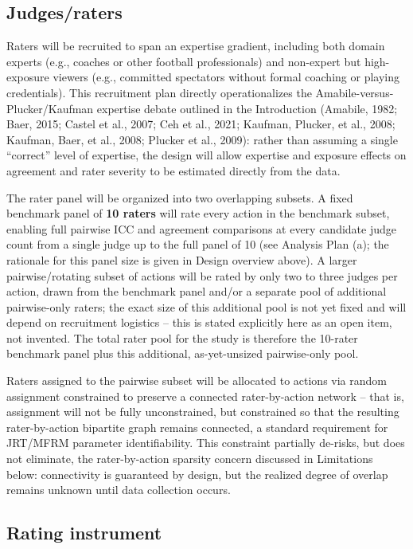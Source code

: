 \documentclass[
  12pt,
]{article}
\begin{document}
\subsection{Judges/raters}\label{judgesraters}

Raters will be recruited to span an expertise gradient, including both
domain experts (e.g., coaches or other football professionals) and
non-expert but high-exposure viewers (e.g., committed spectators without
formal coaching or playing credentials). This recruitment plan directly
operationalizes the Amabile-versus-Plucker/Kaufman expertise debate
outlined in the Introduction (Amabile, 1982; Baer, 2015; Castel et al.,
2007; Ceh et al., 2021; Kaufman, Plucker, et al., 2008; Kaufman, Baer,
et al., 2008; Plucker et al., 2009): rather than assuming a single
``correct'' level of expertise, the design will allow expertise and
exposure effects on agreement and rater severity to be estimated
directly from the data.

The rater panel will be organized into two overlapping subsets. A fixed
benchmark panel of \textbf{10 raters} will rate every action in the
benchmark subset, enabling full pairwise ICC and agreement comparisons
at every candidate judge count from a single judge up to the full panel
of 10 (see Analysis Plan (a); the rationale for this panel size is given
in Design overview above). A larger pairwise/rotating subset of actions
will be rated by only two to three judges per action, drawn from the
benchmark panel and/or a separate pool of additional pairwise-only
raters; the exact size of this additional pool is not yet fixed and will
depend on recruitment logistics -- this is stated explicitly here as an
open item, not invented. The total rater pool for the study is therefore
the 10-rater benchmark panel plus this additional, as-yet-unsized
pairwise-only pool.

Raters assigned to the pairwise subset will be allocated to actions via
random assignment constrained to preserve a connected rater-by-action
network -- that is, assignment will not be fully unconstrained, but
constrained so that the resulting rater-by-action bipartite graph
remains connected, a standard requirement for JRT/MFRM parameter
identifiability. This constraint partially de-risks, but does not
eliminate, the rater-by-action sparsity concern discussed in Limitations
below: connectivity is guaranteed by design, but the realized degree of
overlap remains unknown until data collection occurs.

\subsection{Rating instrument}\label{rating-instrument}
\end{document}
